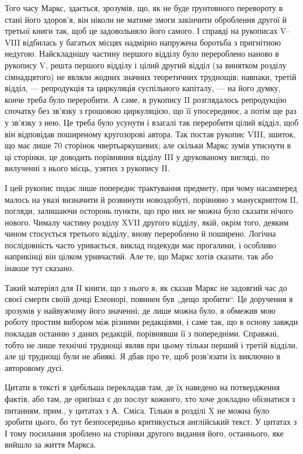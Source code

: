 Того часу Маркс, здається, зрозумів, що, як не буде ґрунтовного перевороту
в стані його здоров’я, він ніколи не матиме змоги закінчити оброблення
другої й третьої книги так, щоб це задовольняло його самого. І справді
на рукописах V--VIII відбилась у багатьох місцях надмірно напружена
боротьба з пригнітною недугою. Найскладнішу частину першого відділу
було перероблено наново в рукопису V, решта першого відділу і цілий
другий відділ (за винятком розділу сімнадцятого) не являли жодних
значних теоретичних труднощів; навпаки, третій відділ, — репродукція
та циркуляція суспільного капіталу, — на його думку, конче треба
було переробити. А саме, в рукопису II розглядалось репродукцію
спочатку без зв’язку з грошовою циркуляцією, що її упосереднює, а потім
ще раз у зв’язку з нею. Це треба було усунути і взагалі так переробити
цілий відділ, щоб він відповідав поширеному кругозорові автора.
Так постав рукопис VIII, зшиток, що має лише 70 сторінок чвертьаркушевих;
але скільки Маркс зумів утиснути в ці сторінки, це доводить
порівняння відділу III у друкованому вигляді, по вилученні з нього
місць, узятих з рукопису II.

І цей рукопис подає лише попереднє трактування предмету, при чому
насамперед малось на увазі визначити й розвинути новоздобуті, порівняно
з манускриптом II, погляди, залишаючи осторонь пункти, що про них
не можна було сказати нічого нового. Чималу частину розділу XVII
другого відділу, якій, окрім того, деяким чином стосується третього відділу,
внову перероблено й поширено. Логічна послідовність часто уривається,
виклад подекуди має прогалини, і особливо наприкінці він цілком
уривчастий. Але те, що Маркс хотів сказати, так або інакше тут сказано.

Такий матеріял для II книги, що з нього я, як сказав Маркс не задовгий
час до своєї смерти своїй дочці Елеонорі, повинен був „дещо зробити“.
Це доручення я зрозумів у найвужчому його значенні; де лише
можна було, я обмежив мою роботу простим вибором між різними редакціями,
і саме так, що в основу завжди покладав останню з даних редакцій,
порівнявши її з попередніми. Справжні, тобто не лише технічні
труднощі являв при цьому тільки перший і третій відділи, але ці труднощі
були не абиякі. Я дбав про те, щоб розв’язати їх виключно в
авторовому дусі.

Цитати в тексті я здебільша перекладав там, де їх наведено на потвердження
фактів, або там, де ориґінал є до послуг кожного, хто хоче
докладно обізнатися з питанням, прим., у цитатах з А.~Сміса. Тільки в
розділі X не можна було зробити цього, бо тут безпосередньо критикується
англійський текст. У цитатах з І тому посилання зроблено на
сторінки другого видання його, останнього, яке вийшло за життя
Маркса.

